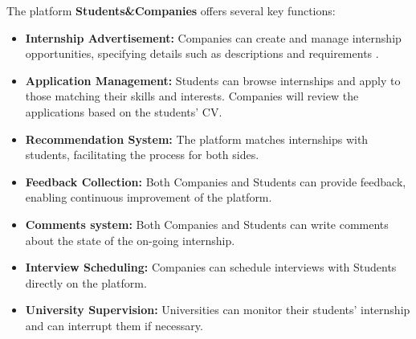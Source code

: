 \documentclass{article}
\begin{document}
The platform \textbf{Students\&Companies} offers several key functions:

\begin{itemize}

    \item \textbf{Internship Advertisement:} 
    Companies can create and manage internship opportunities, specifying details such as descriptions and requirements .

    \item \textbf{Application Management:} 
    Students can browse internships and apply to those matching their skills and interests. Companies will review the applications based on the students' CV.

    \item \textbf{Recommendation System:} 
    The platform matches internships with students, facilitating the process for both sides.

    \item \textbf{Feedback Collection:} 
    Both Companies and Students can provide feedback, enabling continuous improvement of the platform.

    \item \textbf{Comments system:} 
    Both Companies and Students can write comments about the state of the on-going internship.

    \item \textbf{Interview Scheduling:} 
    Companies can schedule interviews with Students directly on the platform.

    \item \textbf{University Supervision:} 
    Universities can monitor their students' internship and can interrupt them if necessary.

\end{itemize}
\end{document}
